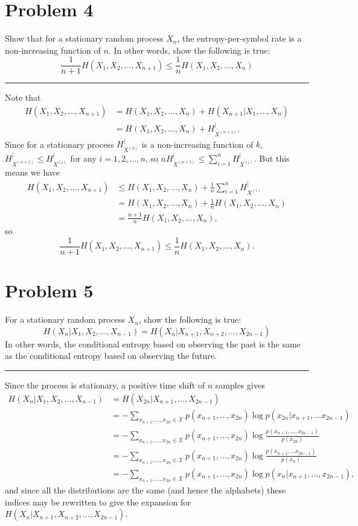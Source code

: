 \documentclass{article}
\newcommand{\horline}
           {\begin{center}
              \noindent\rule{8cm}{0.4pt}
            \end{center}}
\begin{document}
\section*{Problem 4}
Show that for a stationary random process $X_n$, the entropy-per-symbol rate
is a non-increasing function of $n$. In other words, show the following is
true:
$$
\frac{1}{n+1} H(X_1, X_2, \dots, X_{n+1}) \leq 
  \frac{1}{n} H(X_1, X_2, \dots, X_n)
$$
\horline
Note that
\begin{align*}
H(X_1, X_2, \dots, X_{n+1}) 
&= H(X_1, X_2, \dots, X_{n}) + H(X_{n+1} | X_1, \dots, X_n)\\
&= H(X_1, X_2, \dots, X_{n}) + H_{X^{(n+1)}}^{|}.
\end{align*}
Since for a stationary process $H_{X^{(k)}}^{|}$ is a non-increasing 
function of $k$, $H_{X^{(n+1)}}^{|} \leq H_{X^{(i)}}^{|}$ for any 
$i=1,2,\dots,n$, so $nH_{X^{(n+1)}}^{|} \leq \sum_{i=1}^n H_{X^{(i)}}^{|}$.
But this means we have
\begin{align*}
H(X_1, X_2, \dots, X_{n+1}) 
  &\leq H(X_1, X_2, \dots, X_{n}) 
     + \frac{1}{n}\sum_{i=1}^n H_{X^{(i)}}^{|} \\
  &=    H(X_1, X_2, \dots, X_{n}) + \frac{1}{n}H(X_1, X_2, \dots, X_{n}) \\
  &= \frac{n+1}{n} H(X_1, X_2, \dots, X_{n}),
\end{align*}
so
$$
\frac{1}{n+1} H(X_1, X_2, \dots, X_{n+1}) 
  \leq \frac{1}{n}H(X_1, X_2, \dots, X_n).
$$

\section*{Problem 5}
For a stationary random process $X_n$, show the following is true:
$$
H(X_n | X_1, X_2, \dots, X_{n-1}) 
  = H(X_n | X_{n+1}, X_{n+2}, \dots, X_{2n-1})
$$
In other words, the conditional entropy based on observing the past is the
same as the conditional entropy based on observing the future.
\horline
Since the process is stationary, a positive time shift of $n$ samples gives
\begin{align*}
H(X_n | X_1, X_2, \dots, X_{n-1}) &= H(X_{2n} | X_{n+1}, \dots, X_{2n-1})
\\&= -\sum_{x_{n+1}, \dots, x_{2n} \in \mathcal{X}}
       p(x_{n+1}, \dots, x_{2n}) \log p(x_{2n} | x_{n+1}, \dots x_{2n-1}) \\
 &= -\sum_{x_{n+1}, \dots, x_{2n} \in \mathcal{X}}
      p(x_{n+1}, \dots, x_{2n}) 
        \log\frac{p(x_{n+1}, \dots, x_{2n-1})}{p(x_{2n})} \\
 &= -\sum_{x_{n+1}, \dots, x_{2n} \in \mathcal{X}}
      p(x_{n+1}, \dots, x_{2n})
         \log\frac{p(x_{n+1}, \dots x_{2n-1})}{p(x_{n})} \\
 &= -\sum_{x_{n+1}, \dots, x_{2n} \in \mathcal{X}}
      p(x_{n+1}, \dots, x_{2n})
        \log p(x_n | x_{n+1}, \dots, x_{2n-1}),
\end{align*}
and since all the distributions are the same (and hence the alphabets) 
these indices may be rewritten to give the expansion for 
$H(X_n | X_{n+1}, X_{n+2}, \dots, X_{2n-1})$.
\end{document}
